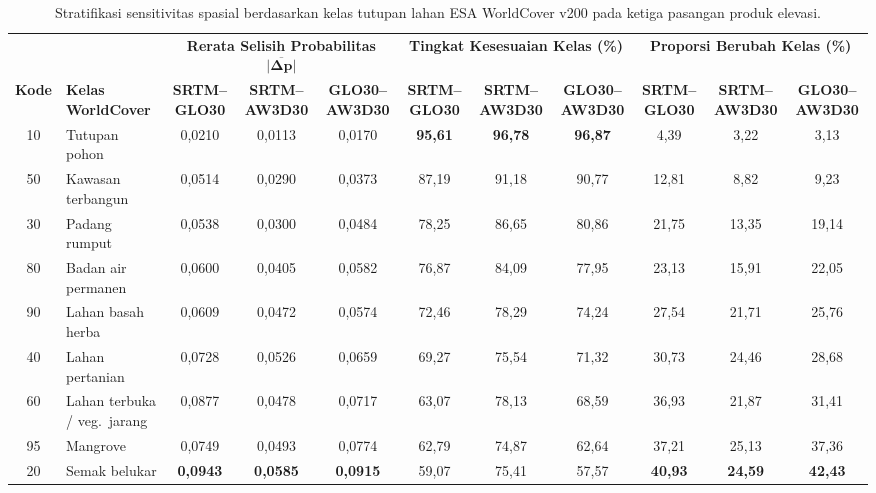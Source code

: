 \documentclass[12pt,a4paper]{article}
\newenvironment{adjustbox}[1]{%
  \begin{lrbox}{\adjboxtemp}%
}{%
  \end{lrbox}%
  \ifdim\wd\adjboxtemp>\textwidth
    \resizebox{\textwidth}{!}{\usebox{\adjboxtemp}}%
  \else
    \usebox{\adjboxtemp}%
  \fi
}
\begin{document}
\begin{table}[!htbp]
\small
\centering
\caption[Stratifikasi sensitivitas spasial berdasarkan kelas WorldCover]{Stratifikasi sensitivitas spasial berdasarkan kelas tutupan lahan ESA WorldCover v200 pada ketiga pasangan produk elevasi.}
\label{tab:worldcover}
\begin{adjustbox}{max width=\textwidth}
\begin{tabular}{cl ccc ccc ccc}
\toprule
& & \multicolumn{3}{c}{\textbf{Rerata Selisih Probabilitas $\boldsymbol{\overline{|\Delta p|}}$}} & \multicolumn{3}{c}{\textbf{Tingkat Kesesuaian Kelas (\%)}} & \multicolumn{3}{c}{\textbf{Proporsi Berubah Kelas (\%)}} \\
\cmidrule(lr){3-5} \cmidrule(lr){6-8} \cmidrule(lr){9-11}
\textbf{Kode} & \textbf{Kelas WorldCover} & \textbf{SRTM--GLO30} & \textbf{SRTM--AW3D30} & \textbf{GLO30--AW3D30} & \textbf{SRTM--GLO30} & \textbf{SRTM--AW3D30} & \textbf{GLO30--AW3D30} & \textbf{SRTM--GLO30} & \textbf{SRTM--AW3D30} & \textbf{GLO30--AW3D30} \\
\midrule
10 & Tutupan pohon & 0,0210 & 0,0113 & 0,0170 & \textbf{95,61} & \textbf{96,78} & \textbf{96,87} & 4,39 & 3,22 & 3,13 \\
50 & Kawasan terbangun & 0,0514 & 0,0290 & 0,0373 & 87,19 & 91,18 & 90,77 & 12,81 & 8,82 & 9,23 \\
30 & Padang rumput & 0,0538 & 0,0300 & 0,0484 & 78,25 & 86,65 & 80,86 & 21,75 & 13,35 & 19,14 \\
80 & Badan air permanen & 0,0600 & 0,0405 & 0,0582 & 76,87 & 84,09 & 77,95 & 23,13 & 15,91 & 22,05 \\
90 & Lahan basah herba & 0,0609 & 0,0472 & 0,0574 & 72,46 & 78,29 & 74,24 & 27,54 & 21,71 & 25,76 \\
40 & Lahan pertanian & 0,0728 & 0,0526 & 0,0659 & 69,27 & 75,54 & 71,32 & 30,73 & 24,46 & 28,68 \\
60 & Lahan terbuka / veg.\ jarang & 0,0877 & 0,0478 & 0,0717 & 63,07 & 78,13 & 68,59 & 36,93 & 21,87 & 31,41 \\
95 & Mangrove & 0,0749 & 0,0493 & 0,0774 & 62,79 & 74,87 & 62,64 & 37,21 & 25,13 & 37,36 \\
20 & Semak belukar & \textbf{0,0943} & \textbf{0,0585} & \textbf{0,0915} & 59,07 & 75,41 & 57,57 & \textbf{40,93} & \textbf{24,59} & \textbf{42,43} \\
\bottomrule
\end{tabular}
\end{adjustbox}
\end{table}
\end{document}
